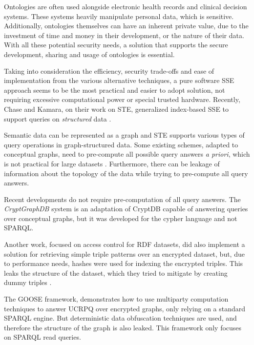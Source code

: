 Ontologies are often used alongside electronic health records and clinical decision systems. These systems heavily manipulate personal data, which is sensitive. Additionally, ontologies themselves can have an inherent private value, due to the investment of time and money in their development, or the nature of their data. With all these potential security needs, a solution that supports the secure development, sharing and usage of ontologies is essential.

Taking into consideration the efficiency, security trade-offs and ease of implementation from the various alternative techniques, a pure software \gls{SSE} approach seems to be the most practical and easier to adopt solution, not requiring excessive computational power or special trusted hardware. Recently, Chase and Kamara, on their work on \gls{STE}, generalized index-based \gls{SSE} to support queries on \emph{structured} data \autocite{Chase2010-xx}.

Semantic data can be represented as a graph and \gls{STE} supports various types of query operations in graph-structured data. Some existing schemes, adapted to conceptual graphs, need to pre-compute all possible query answers \emph{a priori}, which is not practical for large datasets \autocite{Poh2012-qs}. Furthermore, there can be leakage of information about the topology of the data while trying to pre-compute all query answers. 

Recent developments do not require pre-computation of all query answers. The \emph{CryptGraphDB} \cite{Aburawi2018-pq} system is an adaptation of CryptDB \cite{Popa2011-zb, Popa2012-bw, Popa2011-ci} capable of answering queries over conceptual graphs, but it was developed for the cypher \cite{Neo4j_Inc_undated-ft} language and not \gls{SPARQL}.

Another work, focused on access control for RDF datasets, did also implement a solution for retrieving simple triple patterns over an encrypted dataset, but, due to performance needs, hashes were used for indexing the encrypted triples. This leaks the structure of the dataset, which they tried to mitigate by creating dummy triples \cite{Fernandez2017-bh}.

The \gls{GOOSE} \cite{Ciucanu2020-lx} framework, demonstrates how to use multiparty computation techniques to answer \gls{UCRPQ} over encrypted graphs, only relying on a standard SPARQL engine. But deterministic data obfuscation techniques are used, and therefore the structure of the graph is also leaked. This framework only focuses on SPARQL read queries.

